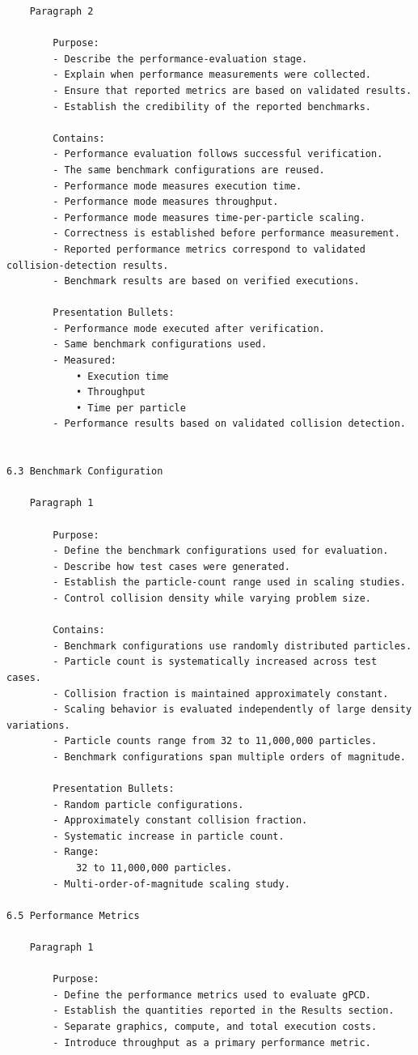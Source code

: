\begin{verbatim}
	Paragraph 2

		Purpose:
		- Describe the performance-evaluation stage.
		- Explain when performance measurements were collected.
		- Ensure that reported metrics are based on validated results.
		- Establish the credibility of the reported benchmarks.

		Contains:
		- Performance evaluation follows successful verification.
		- The same benchmark configurations are reused.
		- Performance mode measures execution time.
		- Performance mode measures throughput.
		- Performance mode measures time-per-particle scaling.
		- Correctness is established before performance measurement.
		- Reported performance metrics correspond to validated collision-detection results.
		- Benchmark results are based on verified executions.

		Presentation Bullets:
		- Performance mode executed after verification.
		- Same benchmark configurations used.
		- Measured:
			• Execution time
			• Throughput
			• Time per particle
		- Performance results based on validated collision detection.


6.3 Benchmark Configuration

	Paragraph 1

		Purpose:
		- Define the benchmark configurations used for evaluation.
		- Describe how test cases were generated.
		- Establish the particle-count range used in scaling studies.
		- Control collision density while varying problem size.

		Contains:
		- Benchmark configurations use randomly distributed particles.
		- Particle count is systematically increased across test cases.
		- Collision fraction is maintained approximately constant.
		- Scaling behavior is evaluated independently of large density variations.
		- Particle counts range from 32 to 11,000,000 particles.
		- Benchmark configurations span multiple orders of magnitude.

		Presentation Bullets:
		- Random particle configurations.
		- Approximately constant collision fraction.
		- Systematic increase in particle count.
		- Range:
			32 to 11,000,000 particles.
		- Multi-order-of-magnitude scaling study.

6.5 Performance Metrics

	Paragraph 1

		Purpose:
		- Define the performance metrics used to evaluate gPCD.
		- Establish the quantities reported in the Results section.
		- Separate graphics, compute, and total execution costs.
		- Introduce throughput as a primary performance metric.


\end{verbatim}

